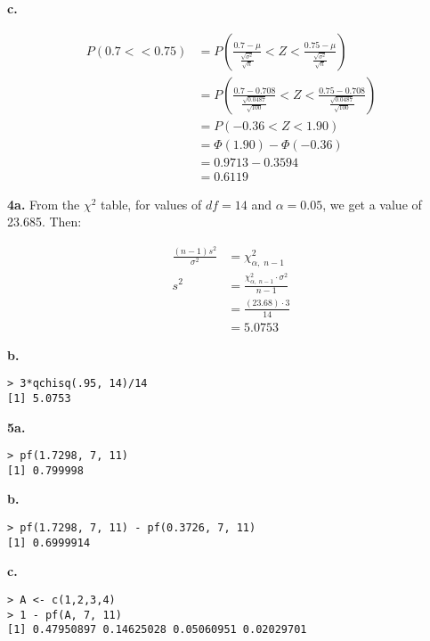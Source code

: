 \documentclass[12pt]{report}
\makeatletter
\newcommand*{\Xbar}{}%
\DeclareRobustCommand*{\Xbar}{%
	\mathpalette\@Xbar{}%
}
\newcommand*{\@Xbar}[2]{%
	\sbox0{$#1\mathrm{X}\m@th$}%
	\sbox2{$#1X\m@th$}%
	\rlap{%
		\hbox to\wd2{%
			\hfill
			$\overline{%
				\vrule width 0pt height\ht0 %
				\kern\wd0 %
			}$%
		}%
	}%
	\copy2 %
}
\makeatother
\begin{document}
\noindent \textbf{c.} 

\begin{align*}
	P(0.7 < \Xbar < 0.75) &= P\left(\frac{0.7 - \mu}{\frac{\sqrt{\sigma^2}}{\sqrt{n}}} < Z < \frac{0.75 - \mu}{\frac{\sqrt{\sigma^2}}{\sqrt{n}}}\right)\\
	&= P\left(\frac{0.7 - 0.708}{\frac{\sqrt{0.0487}}{\sqrt{100}}} < Z < \frac{0.75 - 0.708}{\frac{\sqrt{0.0487}}{\sqrt{100}}}\right)\\
	&= P(-0.36 < Z < 1.90)\\
	&= \Phi(1.90) - \Phi(-0.36)\\
	&= 0.9713 - 0.3594\\
	&= \boxed{0.6119}
\end{align*}

\pagebreak
\noindent \textbf{4a.} From the $\chi^2$ table, for values of $df = 14$ and $\alpha = 0.05$, we get a value of 23.685. Then:

\begin{align*}
	\frac{(n-1)s^2}{\sigma^2} &= \chi^2_{\alpha,\; n-1}\\
	s^2 &= \frac{\chi^2_{\alpha,\;n-1} \cdot \sigma^2}{n-1}\\
	&= \frac{(23.68) \cdot 3}{14}\\
	&= \boxed{5.0753}
\end{align*}

\noindent \textbf{b.} 
\begin{verbatim}
> 3*qchisq(.95, 14)/14
[1] 5.0753
\end{verbatim}

\noindent \textbf{5a.} 
\begin{verbatim}
> pf(1.7298, 7, 11)
[1] 0.799998
\end{verbatim}

\noindent \textbf{b.}
\begin{verbatim}
> pf(1.7298, 7, 11) - pf(0.3726, 7, 11)
[1] 0.6999914
\end{verbatim}

\noindent \textbf{c.}
\begin{verbatim}
> A <- c(1,2,3,4)
> 1 - pf(A, 7, 11)
[1] 0.47950897 0.14625028 0.05060951 0.02029701
\end{verbatim}
\end{document}
